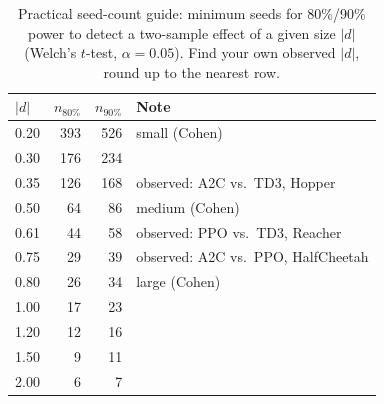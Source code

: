 \begin{table}[t]
\centering
\footnotesize
\caption{Practical seed-count guide: minimum seeds for 80\%/90\% power to detect a two-sample effect of a given size $|d|$ (Welch's $t$-test, $\alpha{=}0.05$). Find your own observed $|d|$, round up to the nearest row.}
\label{tab:seed_guide}
\begin{tabular}{lrrl}
\toprule
$|d|$ & $n_{80\%}$ & $n_{90\%}$ & Note \\
\midrule
0.20 & 393 & 526 & small (Cohen) \\
0.30 & 176 & 234 &  \\
0.35 & 126 & 168 & observed: A2C vs.\ TD3, Hopper \\
0.50 & 64 & 86 & medium (Cohen) \\
0.61 & 44 & 58 & observed: PPO vs.\ TD3, Reacher \\
0.75 & 29 & 39 & observed: A2C vs.\ PPO, HalfCheetah \\
0.80 & 26 & 34 & large (Cohen) \\
1.00 & 17 & 23 &  \\
1.20 & 12 & 16 &  \\
1.50 & 9 & 11 &  \\
2.00 & 6 & 7 &  \\
\bottomrule
\end{tabular}
\end{table}